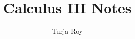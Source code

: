 
\renewcommand{\arraystretch}{1.5}

\title{
    Calculus III Notes
}

\author{
    Turja Roy
}
\date{}


\maketitle

\tableofcontents


\newpage


\newpage


\newpage


\newpage


\newpage


\newpage


